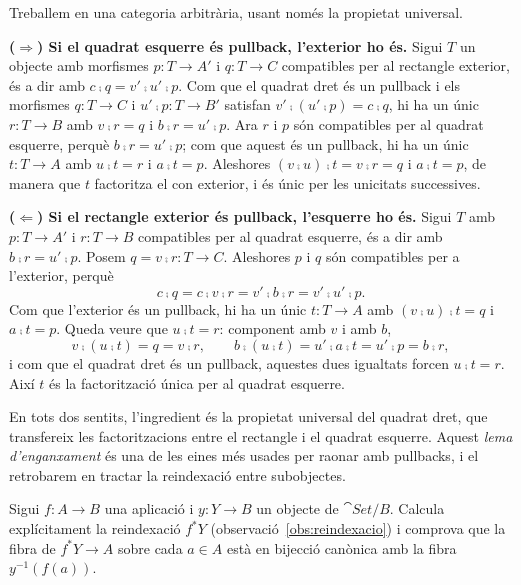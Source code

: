\begin{solucio}
Treballem en una categoria arbitrària, usant només la propietat universal.

\textbf{($\Rightarrow$) Si el quadrat esquerre és pullback, l'exterior ho és.} Sigui $T$ un objecte amb morfismes $p\colon T\to A'$ i $q\colon T\to C$ compatibles per al rectangle exterior, és a dir amb $c\comp q=v'\comp u'\comp p$. Com que el quadrat dret és un pullback i els morfismes $q\colon T\to C$ i $u'\comp p\colon T\to B'$ satisfan $v'\comp(u'\comp p)=c\comp q$, hi ha un únic $r\colon T\to B$ amb $v\comp r=q$ i $b\comp r=u'\comp p$. Ara $r$ i $p$ són compatibles per al quadrat esquerre, perquè $b\comp r=u'\comp p$; com que aquest és un pullback, hi ha un únic $t\colon T\to A$ amb $u\comp t=r$ i $a\comp t=p$. Aleshores $(v\comp u)\comp t=v\comp r=q$ i $a\comp t=p$, de manera que $t$ factoritza el con exterior, i és únic per les unicitats successives.

\textbf{($\Leftarrow$) Si el rectangle exterior és pullback, l'esquerre ho és.} Sigui $T$ amb $p\colon T\to A'$ i $r\colon T\to B$ compatibles per al quadrat esquerre, és a dir amb $b\comp r=u'\comp p$. Posem $q=v\comp r\colon T\to C$. Aleshores $p$ i $q$ són compatibles per a l'exterior, perquè
\[
c\comp q=c\comp v\comp r=v'\comp b\comp r=v'\comp u'\comp p.
\]
Com que l'exterior és un pullback, hi ha un únic $t\colon T\to A$ amb $(v\comp u)\comp t=q$ i $a\comp t=p$. Queda veure que $u\comp t=r$: component amb $v$ i amb $b$,
\[
v\comp(u\comp t)=q=v\comp r,\qquad b\comp(u\comp t)=u'\comp a\comp t=u'\comp p=b\comp r,
\]
i com que el quadrat dret és un pullback, aquestes dues igualtats forcen $u\comp t=r$. Així $t$ és la factorització única per al quadrat esquerre.

En tots dos sentits, l'ingredient és la propietat universal del quadrat dret, que transfereix les factoritzacions entre el rectangle i el quadrat esquerre. Aquest \emph{lema d'enganxament} és una de les eines més usades per raonar amb pullbacks, i el retrobarem en tractar la reindexació entre subobjectes.
\end{solucio}

\begin{exercici}\label{pr-reindexacio-set}
Sigui $f\colon A\to B$ una aplicació i $y\colon Y\to B$ un objecte de $\cat{Set}/B$. Calcula explícitament la reindexació $f^{*}Y$ (observació~\ref{obs:reindexacio}) i comprova que la fibra de $f^{*}Y\to A$ sobre cada $a\in A$ està en bijecció canònica amb la fibra $y^{-1}(f(a))$.
\end{exercici}

